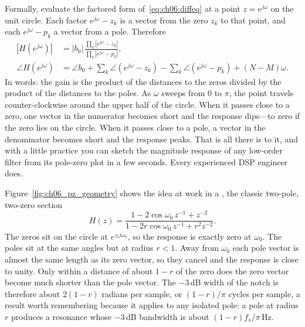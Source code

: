 Formally, evaluate the factored form of~\eqref{eq:ch06:diffeq} at a point $z=e^{j\omega}$ on the
unit circle. Each factor $e^{j\omega}-z_k$ is a vector from the zero $z_k$ to that point, and each
$e^{j\omega}-p_k$ a vector from a pole. Therefore
\begin{equation}
\begin{aligned}
|H(e^{j\omega})|&=|b_0|\,\frac{\prod_k|e^{j\omega}-z_k|}{\prod_k|e^{j\omega}-p_k|},\\
\angle H(e^{j\omega})&=\angle b_0+\sum_k\angle(e^{j\omega}-z_k)-\sum_k\angle(e^{j\omega}-p_k)+(N-M)\omega.
\end{aligned}
\label{eq:ch06:geometry}
\end{equation}
In words: the gain is the product of the distances to the zeros divided by the product of the
distances to the poles. As $\omega$ sweeps from $0$ to $\pi$, the point travels counter-clockwise
around the upper half of the circle. When it passes close to a zero, one vector in the numerator
becomes short and the response dips---to zero if the zero lies on the circle. When it passes close
to a pole, a vector in the denominator becomes short and the response peaks. That is all there is
to it, and with a little practice you can sketch the magnitude response of any low-order filter
from its pole-zero plot in a few seconds. Every experienced DSP engineer does.


Figure~\ref{fig:ch06_pz_geometry} shows the idea at work in a , the classic
two-pole, two-zero section
\begin{equation}
H(z)=\frac{1-2\cos\omega_0\,z^{-1}+z^{-2}}{1-2r\cos\omega_0\,z^{-1}+r^2z^{-2}}.
\label{eq:ch06:notch}
\end{equation}
The zeros sit on the circle at $e^{\pm j\omega_0}$, so the response is exactly zero at $\omega_0$.
The poles sit at the same angles but at radius $r<1$. Away from $\omega_0$ each pole vector is
almost the same length as its zero vector, so they cancel and the response is close to unity.
Only within a distance of about $1-r$ of the zero does the zero vector become much shorter than the
pole vector. The $-3$\,dB width of the notch is therefore about $2(1-r)$ radians per sample, or
$(1-r)/\pi$ cycles per sample, a result worth remembering because it applies to any isolated
pole: a pole at radius $r$ produces a resonance whose $-3$\,dB bandwidth is about $(1-r)f_s/\pi$\,Hz.

